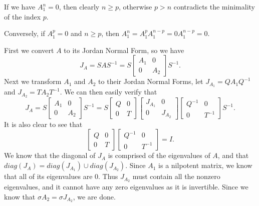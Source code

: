 \documentclass{article}
\begin{document}
\begin{solution}
  If we have $A_1^n = 0$, then clearly $n \ge p$, otherwise $p > n$ contradicts the minimality of the index $p$.

  Conversely, if $A_1^p = 0$ and $n \ge p$, then $A_1^n = A_1^{p} A_1^{n - p} = 0 A_1^{n - p} = 0$.

  First we convert $A$ to its Jordan Normal Form, so we have
  \[J_A = S A S^{- 1} = S \begin{bmatrix} A_1 & 0\\ 0 & A_2 \end{bmatrix} S^{- 1}.\]
  Next we transform $A_1$ and $A_2$ to their Jordan Normal Forms, let $J_{A_1} = Q A_1 Q^{- 1}$ and $J_{A_2} = T A_2 T^{- 1}$.
  We can then easily verify that
  \[J_A = S \begin{bmatrix} A_1 & 0\\ 0 & A_2 \end{bmatrix} S^{- 1} = S \begin{bmatrix} Q & 0\\ 0 & T \end{bmatrix} \begin{bmatrix} J_{A_1} & 0\\ 0 & J_{A_2} \end{bmatrix} \begin{bmatrix} Q^{- 1} & 0\\ 0 & T^{- 1} \end{bmatrix} S^{- 1}.\]
  It is also clear to see that
  \[\begin{bmatrix} Q & 0\\ 0 & T \end{bmatrix} \begin{bmatrix} Q^{- 1} & 0\\ 0 & T^{- 1} \end{bmatrix} = I.\]
  We know that the diagonal of $J_A$ is comprised of the eigenvalues of $A$, and that $diag(J_A) = diag(J_{A_1}) \cup diag(J_{A_2})$.
  Since $A_1$ is a nilpotent matrix, we know that all of its eigenvalues are 0.
  Thus $J_{A_2}$ must contain all the nonzero eigenvalues, and it cannot have any zero eigenvalues as it is invertible.
  Since we know that $\sigma{A_2} = \sigma{J_{A_2}}$, we are done.


\end{solution}
\end{document}
